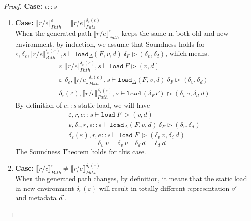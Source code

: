 \documentclass[10pt,twoside,a4paper]{article}
\theoremstyle{theorem}
\theoremstyle{lemma}
\theoremstyle{property}
\theoremstyle{definition}
\theoremstyle{assumption}
\begin{document}
\begin{proof}
	\textbf{Case: } $e::s$\\
	\begin{enumerate}
	\item 
	\textbf{Case: } $\llbracket r/e \rrbracket^{\varepsilon}_{Path} = \llbracket r/e \rrbracket^{\delta_\varepsilon(\varepsilon)}_{Path}$ \\
	When the generated path $\llbracket r/e \rrbracket^{\varepsilon}_{Path}$ keeps the same in both old and new environment, by induction, we assume that Soundness holds for $\varepsilon, \delta_\varepsilon, \llbracket r/e \rrbracket^{\delta_\varepsilon(\varepsilon)}_{Path}, s \vdash \mathtt{load}_\Delta (F,v,d)~ \delta_F \rhd (\delta_v,\delta_d)$, which means.
	\begin{align*}
			& \varepsilon, \llbracket r/e \rrbracket^{\delta_\varepsilon(\varepsilon)}_{Path}, s \vdash \mathtt{load}~ F \rhd (v,d)\\
			& \varepsilon, \delta_\varepsilon, \llbracket r/e \rrbracket^{\delta_\varepsilon(\varepsilon)}_{Path}, s \vdash \mathtt{load}_\Delta (F,v,d)~ \delta_F \rhd (\delta_v,\delta_d)\\
			& \delta_\varepsilon(\varepsilon), \llbracket r/e \rrbracket^{\delta_\varepsilon(\varepsilon)}_{Path}, s \vdash \mathtt{load} ~(\delta_F F) \rhd (\delta_v~v,\delta_d~d)
	\end{align*}
	By definition of $e::s$ static load, we will have
	\begin{align*}
			& \varepsilon, r, e::s \vdash \mathtt{load}~ F~ \rhd (v,d)\\
			& \varepsilon, \delta_\varepsilon, r, e::s \vdash \mathtt{load}_\Delta (F,v,d)~ \delta_F \rhd (\delta_v,\delta_d)\\
			& \delta_\varepsilon(\varepsilon), r, e::s \vdash \mathtt{load}~ F~ \rhd (\delta_v~v,\delta_d~d)
	\end{align*}
	\begin{displaymath}
		\delta_v~v = \delta_v~v \quad \delta_d~d = \delta_d~d
	\end{displaymath}
	The Soundness Theorem holds for this case.
	\item 
	\textbf{Case: } $\llbracket r/e \rrbracket^{\varepsilon}_{Path} \not= \llbracket r/e \rrbracket^{\delta_\varepsilon(\varepsilon)}_{Path}$ \\
	When the generated path changes, by definition, it means that the static load in new environment $\delta_\varepsilon(\varepsilon)$ will result in totally different representation $v'$ and metadata $d'$.

\end{enumerate}
\end{proof}
\end{document}

